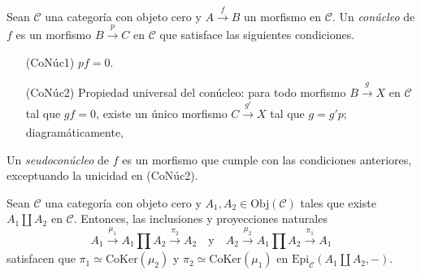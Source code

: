 \documentclass[tesis]{subfiles}
\begin{document}
\begin{Def} \label{Def: Conúcleo}
    Sean $\mathscr{C}$ una categoría con objeto cero y $A\xrightarrow{f} B$ un morfismo en $\mathscr{C}$. Un \emph{conúcleo} de $f$ es un morfismo $B\xrightarrow{p} C$ en $\mathscr{C}$ que satisface las siguientes condiciones.
    \begin{itemize}
    
        \item[(CoNúc1)] $pf=0$. \\

        \item[(CoNúc2)] Propiedad universal del conúcleo: para todo morfismo $B\xrightarrow{g} X$ en $\mathscr{C}$ tal que $gf=0$, existe un único morfismo $C\xrightarrow[]{g'} X$ tal que $g=g'p$; diagramáticamente,
            \begin{center}
            \end{center}
    \end{itemize}
    Un \emph{seudoconúcleo} de $f$ es un morfismo que cumple con las condiciones anteriores, exceptuando la unicidad en (CoNúc2).
\end{Def}

\begin{Lema}\label{Mendoza-1.8.2*}
    Sean $\mathscr{C}$ una categoría con objeto cero y $A_1,A_2\in\text{Obj}(\mathscr{C})$ tales que existe $A_1\coprod A_2$ en $\mathscr{C}$. Entonces, las inclusiones y proyecciones naturales
    \[
        A_1\xrightarrow[]{\mu_1}A_1\prod A_2\xrightarrow[]{\pi_2}A_2 \quad \text{y} \quad A_2\xrightarrow[]{\mu_2}A_1\prod A_2\xrightarrow[]{\pi_1}A_1
    \] 
    satisfacen que $\pi_1\simeq\text{CoKer}(\mu_2)$ y $\pi_2\simeq\text{CoKer}(\mu_1)$ en $\text{Epi}_\mathscr{C}(A_1\coprod A_2,-)$.
\end{Lema}
\end{document}
